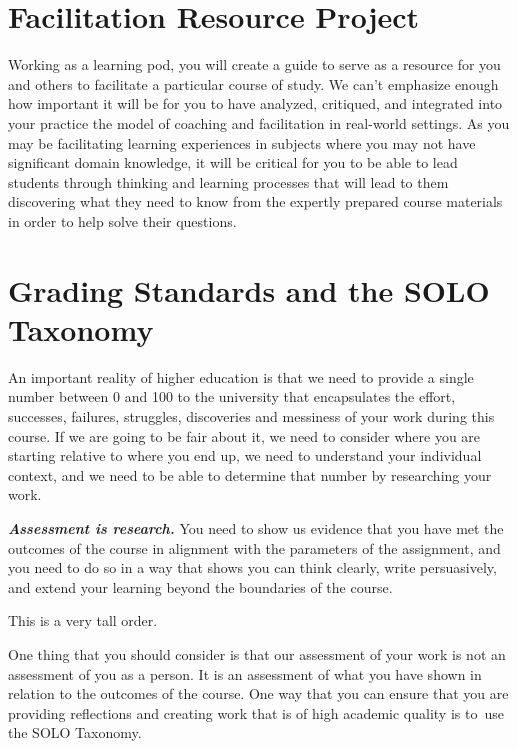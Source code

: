 \documentclass[
]{book}
\begin{document}
\hypertarget{facilitation-resource-project}{%
\section*{Facilitation Resource Project}\label{facilitation-resource-project}}

Working as a learning pod, you will create a guide to serve as a resource for you and others to facilitate a particular course of study. We can't emphasize enough how important it will be for you to have analyzed, critiqued, and integrated into your practice the model of coaching and facilitation in real-world settings. As you may be facilitating learning experiences in subjects where you may not have significant domain knowledge, it will be critical for you to be able to lead students through thinking and learning processes that will lead to them discovering what they need to know from the expertly prepared course materials in order to help solve their questions.

\hypertarget{grading-standards-and-the-solo-taxonomy}{%
\section*{Grading Standards and the SOLO Taxonomy}\label{grading-standards-and-the-solo-taxonomy}}

An important reality of higher education is that we need to provide a single number between 0 and 100 to the university that encapsulates the effort, successes, failures, struggles, discoveries and messiness of your work during this course. If we are going to be fair about it, we need to consider where you are starting relative to where you end up, we need to understand your individual context, and we need to be able to determine that number by researching your work.

\textbf{\emph{Assessment is research.}} You need to show us evidence that you have met the outcomes of the course in alignment with the parameters of the assignment, and you need to do so in a way that shows you can think clearly, write persuasively, and extend your learning beyond the boundaries of the course.

This is a very tall order.

One thing that you should consider is that our assessment of your work is not an assessment of you as a person. It is an assessment of what you have shown in relation to the outcomes of the course. One way that you can ensure that you are providing reflections and creating work that is of high academic quality is to~use the SOLO Taxonomy.
\end{document}
